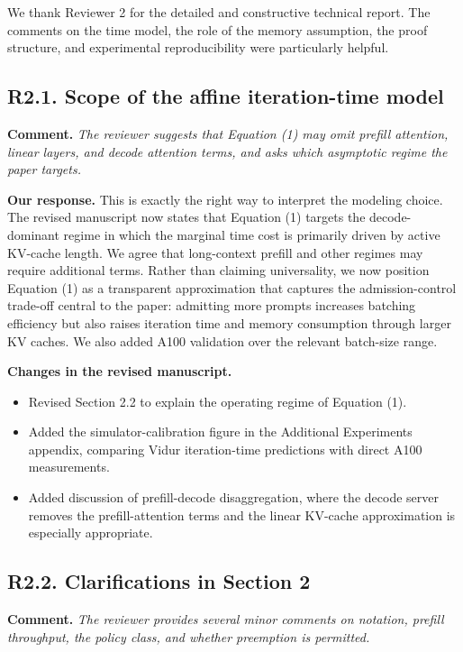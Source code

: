 \documentclass[11pt]{article}
\newcommand{\comment}[1]{%
  \vspace{0.25em}
  \noindent\textbf{Comment.} \emph{#1}
}
\newcommand{\response}{\vspace{0.25em}\noindent\textbf{Our response.} }
\newcommand{\changes}{\vspace{0.25em}\noindent\textbf{Changes in the revised manuscript.} }
\begin{document}
We thank Reviewer 2 for the detailed and constructive technical report. The comments on the time model, the role of the memory assumption, the proof structure, and experimental reproducibility were particularly helpful.

\subsection*{R2.1. Scope of the affine iteration-time model}

\comment{The reviewer suggests that Equation (1) may omit prefill attention, linear layers, and decode attention terms, and asks which asymptotic regime the paper targets.}

\response This is exactly the right way to interpret the modeling choice. The revised manuscript now states that Equation (1) targets the decode-dominant regime in which the marginal time cost is primarily driven by active KV-cache length. We agree that long-context prefill and other regimes may require additional terms. Rather than claiming universality, we now position Equation (1) as a transparent approximation that captures the admission-control trade-off central to the paper: admitting more prompts increases batching efficiency but also raises iteration time and memory consumption through larger KV caches. We also added A100 validation over the relevant batch-size range.

\changes
\begin{itemize}
    \item Revised Section 2.2 to explain the operating regime of Equation (1).
    \item Added the simulator-calibration figure in the Additional Experiments appendix, comparing Vidur iteration-time predictions with direct A100 measurements.
    \item Added discussion of prefill-decode disaggregation, where the decode server removes the prefill-attention terms and the linear KV-cache approximation is especially appropriate.
\end{itemize}

\subsection*{R2.2. Clarifications in Section 2}

\comment{The reviewer provides several minor comments on notation, prefill throughput, the policy class, and whether preemption is permitted.}
\end{document}
